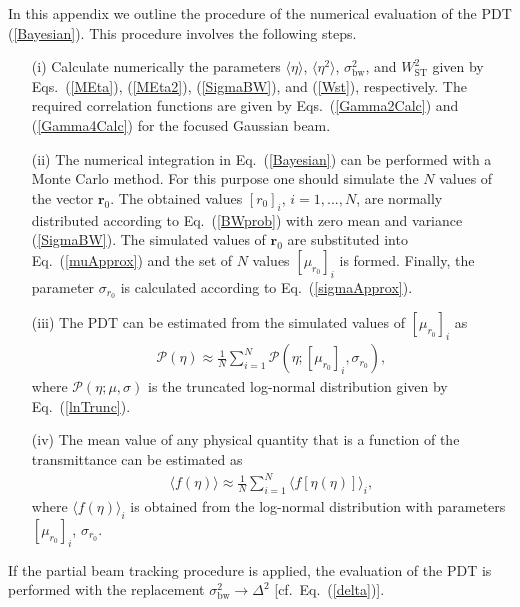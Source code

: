 \documentclass[aps,pra,twocolumn,a4paper,nofootinbib,preprintnumbers] {revtex4-1}
\begin{document}
	In this appendix we outline the procedure of the numerical evaluation of the PDT (\ref{Bayesian}).
	This procedure involves the following steps.
		\begin{itemize}
		  \item[(i)]  Calculate numerically the parameters $\langle\eta\rangle$, $\langle\eta^2\rangle$, $\sigma^2_{\mathrm{bw}}$, and $W_{\mathrm{ST}}^2$ given by Eqs.~(\ref{MEta}), (\ref{MEta2}), (\ref{SigmaBW}), and (\ref{Wst}), respectively.
		  The required correlation functions are given by Eqs.~(\ref{Gamma2Calc}) and (\ref{Gamma4Calc}) for the focused Gaussian beam.
		  \item[(ii)] The numerical integration in Eq.~(\ref{Bayesian}) can be performed with a Monte Carlo method.
		  For this purpose one should simulate  the $N$ values  of the vector $\boldsymbol{r}_0$.
		  The obtained values $[r_0]_i$, $i=1,...,N$, are normally distributed according to Eq.~(\ref{BWprob}) with zero mean and variance (\ref{SigmaBW}).
		  The simulated values of $\boldsymbol{r}_0$ are substituted into Eq.~(\ref{muApprox}) and the set of $N$ values $[\mu_{r_0}]_i$  is formed.
		  Finally, the parameter $\sigma_{r_0}$ is calculated according to Eq.~(\ref{sigmaApprox}).
		  \item[(iii)] The PDT can be estimated from the simulated values of $[\mu_{r_0}]_i$ as
		      \begin{align}
		      \mathcal{P}(\eta)\approx\frac{1}{N}\sum\limits_{i=1}^N \mathcal{P}(\eta;[\mu_{r_0}]_i,\sigma_{r_0}),
		      \end{align}
		  where $\mathcal{P}(\eta;\mu,\sigma)$ is the truncated log-normal distribution given by Eq.~(\ref{lnTrunc}).
		  \item[(iv)] The mean value of any physical quantity that is a function of the transmittance can be estimated as
		      \begin{align}
		      \langle f(\eta)\rangle\approx\frac{1}{N}\sum\limits_{i=1}^N \langle f[\eta(\eta)]\rangle_i,
		      \end{align}
		  where $\langle f(\eta)\rangle_i$ is obtained from the log-normal distribution with parameters $[\mu_{r_0}]_i$, $\sigma_{r_0}$.
		\end{itemize}
	If the partial beam tracking procedure is applied, the evaluation of the PDT is performed with the replacement $\sigma^2_{\mathrm{bw}}\rightarrow\Delta^2$ [cf.~Eq.~(\ref{delta})].



\end{document}
